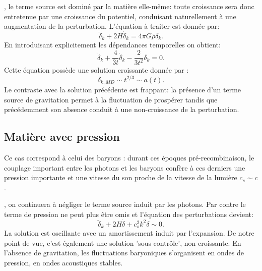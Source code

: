 , le terme source est dominé par la matière elle-même: toute croissance sera donc entretenue par une croissance du potentiel, conduisant naturellement à une augmentation de la perturbation. L'équation à traiter est donnée par:
\begin{equation}
\ddot \delta_k +2 H \dot \delta_k =4\pi G \bar\rho \delta_k.
\end{equation}
En introduisant explicitement les dépendances temporelles on obtient:
\begin{equation}
\ddot \delta_k +\frac{4}{3t}\dot \delta_k - \frac{2}{3t^2}\delta_k=0.
\end{equation}
Cette équation possède une solution croissante donnée par  :
\begin{equation}
\delta_{k,MD}\sim t^{2/3}\sim a(t).
\end{equation}
Le contraste avec la solution précédente est frappant: la présence d'un terme source de gravitation permet à la fluctuation de prospérer tandis que précédemment son absence conduit à une non-croissance de la perturbation.

\subsection{Matière avec pression}
Ce cas correspond à celui des baryons : durant ces époques pré-recombinaison, le couplage important entre les photons et les baryons confère à ces derniers une pression importante et une vitesse du son proche de la vitesse de la lumière $c_s\sim c$.

, on continuera à négliger le terme source induit par les photons. Par contre le terme de pression ne peut plus être omis et l'équation des perturbations devient:
\begin{equation}
\ddot \delta_k+2H\dot \delta +c_s^2k^2 \delta \sim 0.
\end{equation}
La solution est oscillante avec un amortissement induit par l'expansion. De notre point de vue, c'est également une solution 'sous contrôle', non-croissante. En l'absence de gravitation, les fluctuations baryoniques s'organisent en ondes de pression, en ondes acoustiques stables.

